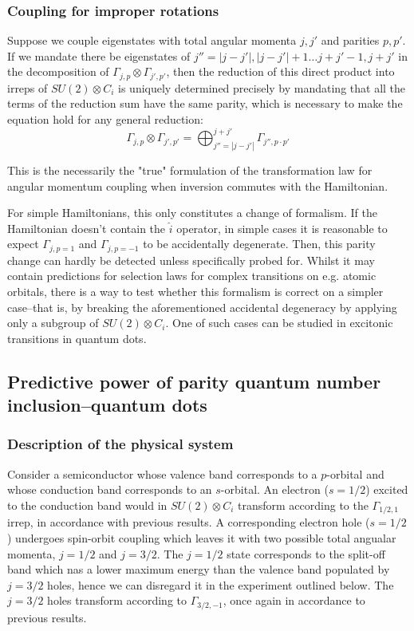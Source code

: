 \documentclass[12pt]{article}
\begin{document}
	\subsubsection{Coupling for improper rotations}
	
	Suppose we couple eigenstates with total angular momenta $j,j'$ and parities $p,p'$. If we mandate there be eigenstates of $j''=|j-j'|, |j-j'|+1\dots j+j'-1, j+j'$ in the decomposition of $\Gamma_{j,p}\otimes\Gamma_{j',p'}$, then the reduction of this direct product into irreps of $SU(2)\otimes C_i$ is uniquely determined precisely by mandating that all the terms of the reduction sum have the same parity, which is necessary to make the equation hold for any general reduction:
	$$\Gamma_{j,p}\otimes\Gamma_{j',p'}=\bigoplus_{j''=|j-j'|}^{j+j'}\Gamma_{j'',p\cdot p'}$$
	
	This is the necessarily the "true" formulation of the transformation law for angular momentum coupling when inversion commutes with the Hamiltonian.
	
	For simple Hamiltonians, this only constitutes a change of formalism. If the Hamiltonian doesn't contain the $\hat{i}$ operator, in simple cases it is reasonable to expect $\Gamma_{j,p=1}$ and $\Gamma_{j,p=-1}$ to be accidentally degenerate. Then, this parity change can hardly be detected unless specifically probed for. Whilst it may contain predictions for selection laws for complex transitions on e.g. atomic orbitals, there is a way to test whether this formalism is correct on a simpler case--that is, by breaking the aforementioned accidental degeneracy by applying only a subgroup of $SU(2)\otimes C_i$. One of such cases can be studied in excitonic transitions in quantum dots.
	
	\subsection{Predictive power of parity quantum number inclusion--quantum dots}
	
	\subsubsection{Description of the physical system}
	Consider a semiconductor whose valence band corresponds to a $p$-orbital and whose conduction band corresponds to an $s$-orbital. An electron ($s=1/2$) excited to the conduction band would in $SU(2)\otimes C_i$ transform according to the $\Gamma_{1/2,1}$ irrep, in accordance with previous results. A corresponding electron hole ($s=1/2$) undergoes spin-orbit coupling which leaves it with two possible total angualar momenta, $j=1/2$ and $j=3/2$. The $j=1/2$ state corresponds to the split-off band which nas a lower maximum energy than the valence band populated by $j=3/2$ holes, hence we can disregard it in the experiment outlined below. The $j=3/2$ holes transform according to $\Gamma_{3/2,-1}$, once again in accordance to previous results.
	
\end{document}
